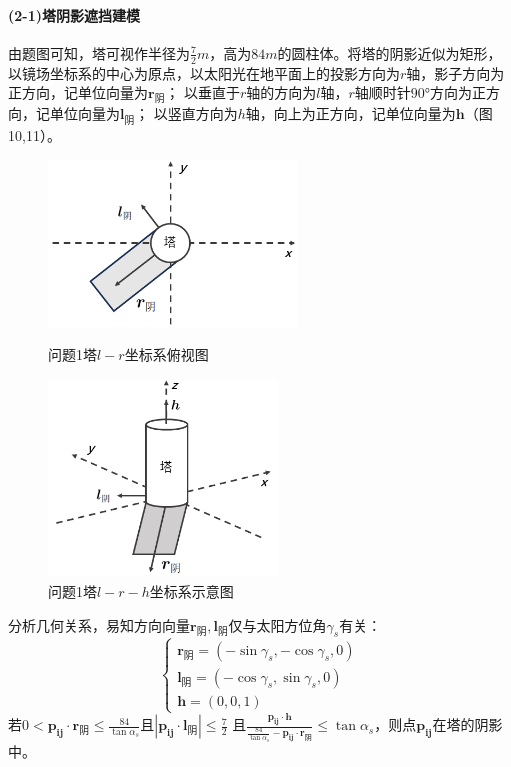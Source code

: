 \documentclass{article}
\numberwithin{equation}{subsection}
\begin{document}
\paragraph{(2-1)塔阴影遮挡建模}

由题图可知，塔可视作半径为$\frac{7}{2}m$，高为$84m$的圆柱体。将塔的阴影近似为矩形，
以镜场坐标系的中心为原点，以太阳光在地平面上的投影方向为$r$轴，影子方向为正方向，记单位向量为$\bm{r_{\text{阴}}}$；
以垂直于$r$轴的方向为$l$轴，$r$轴顺时针$90°$方向为正方向，记单位向量为$\bm{l_{\text{阴}}}$；
以竖直方向为$h$轴，向上为正方向，记单位向量为$\bm{h}$（图10,11）。
\begin{figure}[htbp]
	\begin{minipage}[b]{0.5\linewidth}
		\centering
		\includegraphics[width=2.6in]{问题1-1塔建系图.png}
		\caption{问题1塔$l-r$坐标系俯视图}
	\end{minipage}
	\begin{minipage}[b]{0.5\linewidth}
		\centering
		\includegraphics[width=2.4in]{问题1-1塔投影示意图.png}
		\caption{问题1塔$l-r-h$坐标系示意图}
	\end{minipage}
\end{figure}

\noindent
分析几何关系，易知方向向量$\bm{r_{\text{阴}}},\bm{l_{\text{阴}}}$仅与太阳方位角$\gamma_s$有关：
\begin{equation}
    \left\{\begin{array}{l}
        \bm{r_{\text{阴}}}=\left(-\sin \gamma_s,-\cos \gamma_s,0\right)\\
        \bm{l_{\text{阴}}}=\left(-\cos \gamma_s, \sin \gamma_s,0\right)\\
        \bm{h}=\left(0,0,1\right)
    \end{array}\right.
\end{equation}
若$0<\bm{p_{ij}}\cdot\bm{r_{\text{阴}}}\leq \frac{84}{\tan \alpha_s}$且$|\bm{p_{ij}}\cdot\bm{l_{\text{阴}}}|\leq\frac{7}{2}$
且$\frac{\bm{p_{ij}}\cdot\bm{h}}{\frac{84}{\tan \alpha_s}-\bm{p_{ij}}\cdot\bm{r_{\text{阴}}}}\leq \tan \alpha_s$，则点$\bm{p_{ij}}$在塔的阴影中。
\end{document}

